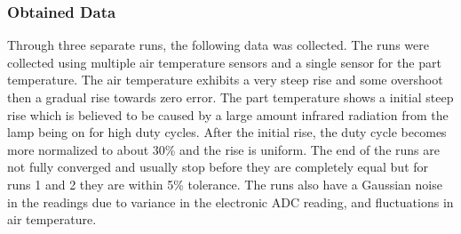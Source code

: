 \subsubsection{Obtained Data}
Through three separate runs, the following data was collected. The runs were collected using multiple air temperature sensors and a single sensor for the part temperature. The air temperature exhibits a very steep rise and some overshoot then a gradual rise towards zero error. The part temperature shows a initial steep rise which is believed to be caused by a large amount infrared radiation from the lamp being on for high duty cycles. After the initial rise, the duty cycle becomes more normalized to about 30\% and the rise is uniform. The end of the runs are not fully converged and usually stop before they are completely equal but for runs 1 and 2 they are within 5\% tolerance. The runs also have a Gaussian noise in the readings due to variance in the electronic ADC reading, and fluctuations in air temperature.

